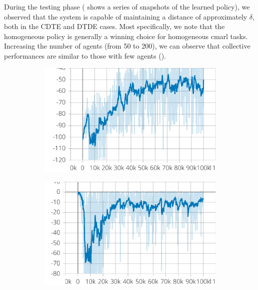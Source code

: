 During the testing phase 
 ( shows a series of snapshots of the learned policy), 
 we observed that the system is capable of maintaining a distance of approximately $\delta$, 
 both in the CDTE and DTDE cases. 
 Most specifically, 
 we note that the homogeneous policy is generally 
 a winning choice for homogeneous \ac{cmarl} tasks. 
%
Increasing the number of agents (from 50 to 200), 
 we can observe that collective performances are similar to those with few agents ().
\begin{figure}[t]
    \centering
    \begin{subfigure}[b]{0.32\textwidth}
        \centering
        \includegraphics[width=\textwidth]{papers/coordination2023/imgs/reward-ctde.pdf}
    \end{subfigure}
    \hfill
    \begin{subfigure}[b]{0.32\textwidth}
        \centering
        \includegraphics[width=\textwidth]{papers/coordination2023/imgs/collision-ctde.pdf}

\end{subfigure}
\end{figure}
